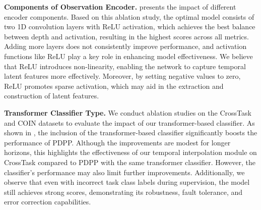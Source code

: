 \textbf{Components of Observation Encoder.}  presents the impact of different encoder components. Based on this ablation study, the optimal model consists of two 1D convolution layers with ReLU activation, which achieves the best balance between depth and activation, resulting in the highest scores across all metrics. Adding more layers does not consistently improve performance, and activation functions like ReLU play a key role in enhancing model effectiveness. We believe that ReLU introduces non-linearity, enabling the network to capture temporal latent features more effectively. Moreover, by setting negative values to zero, ReLU promotes sparse activation, which may aid in the extraction and construction of latent features.

\textbf{Transformer Classifier Type.} We conduct ablation studies on the CrossTask and COIN datasets to evaluate the impact of our transformer-based classifier. As shown in , the inclusion of the transformer-based classifier significantly boosts the performance of PDPP. Although the improvements are modest for longer horizons, this highlights the effectiveness of our temporal interpolation module on CrossTask compared to PDPP with the same transformer classifier. However, the classifier's performance may also limit further improvements. Additionally, we observe that even with incorrect task class labels during supervision, the model still achieves strong scores, demonstrating its robustness, fault tolerance, and error correction capabilities. 



\begin{table}[t]
\centering
\caption{Ablation study on the role of classifier type on CrossTask dataset.}
\vspace{-3mm}
\label{tab:classifier_crosstask}
\end{table}

